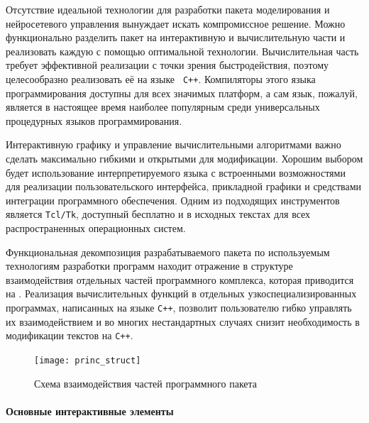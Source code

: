 Отсутствие идеальной технологии для разработки пакета моделирования и
нейросетевого управления вынуждает искать компромиссное решение.
Можно функционально разделить пакет на интерактивную и вычислительную
части и реализовать каждую с помощью оптимальной технологии.
Вычислительная часть требует эффективной реализации с точки зрения
быстродействия, поэтому целесообразно реализовать её на языке {\tt
  C++}.  Компиляторы этого языка программирования доступны для всех
значимых платформ, а сам язык, пожалуй, является в настоящее время
наиболее популярным среди универсальных процедурных языков
программирования.

Интерактивную графику и управление вычислительными алгоритмами важно
сделать максимально гибкими и открытыми для модификации.  Хорошим
выбором будет использование интерпретируемого языка с встроенными
возможностями для реализации пользовательского интерфейса, прикладной
графики и средствами интеграции программного обеспечения.  Одним из
подходящих инструментов является {\tt Tcl/Tk}, доступный бесплатно и в
исходных текстах для всех распространенных операционных систем.

Функциональная декомпозиция разрабатываемого пакета по используемым
технологиям разработки программ находит отражение в структуре
взаимодействия отдельных частей программного комплекса, которая
приводится на .  Реализация
вычислительных функций в отдельных узкоспециализированных программах,
написанных на языке {\tt C++}, позволит пользователю гибко управлять
их взаимодействием и во многих нестандартных случаях снизит
необходимость в модификации текстов на {\tt C++}.

\begin{figure}
\centerline{\texttt{[image: princ\_struct]}}
\caption{Схема взаимодействия частей программного пакета}
\label{fig:prog_interaction_struct}
\end{figure}

\paragraph{Основные интерактивные элементы}

